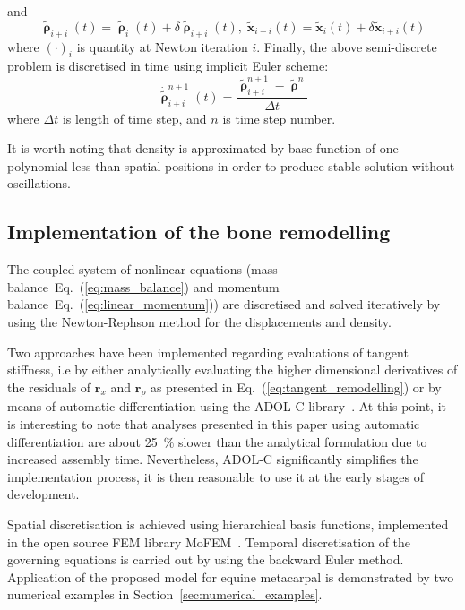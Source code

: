 \documentclass[11pt]{acmeArticle}
\numberwithin{equation}{section}
\begin{document}
and 
\begin{equation}
\tilde{\pmb\uprho}_{i+i}(t) =
\tilde{\pmb\uprho}_{i}(t) + \delta\tilde{\pmb\uprho}_{i+i}(t),\;
	\tilde{\mathbf{x}}_{i+i}(t) =
	\tilde{\mathbf{x}}_{i}(t) + \delta\tilde{\mathbf{x}}_{i+i}(t)
\end{equation}
where $(\cdot)_i$ is quantity at Newton iteration $i$. Finally, the
above semi-discrete problem is discretised in time using implicit Euler scheme:
\begin{equation}
	\dot{\tilde{\pmb\uprho}}_{i+i}^{n+1}(t) =
	\frac{
	\tilde{\pmb\uprho}_{i+i}^{n+1}-\tilde{\pmb\uprho}^{n}
	}{\Delta t}
\end{equation}
where $\Delta t$ is length of time step, and $n$ is time step number.

It is worth noting that density is approximated by base  function of one polynomial less than spatial positions in
order to produce stable solution without oscillations.

\subsection{Implementation of the bone remodelling}

The coupled system of nonlinear equations (mass
balance~Eq.~(\ref{eq:mass_balance}) and momentum
balance~Eq.~(\ref{eq:linear_momentum})) are discretised and solved iteratively by
using the Newton-Rephson method for the displacements and density.

Two approaches have been implemented regarding evaluations of tangent stiffness,
i.e by either analytically evaluating the higher dimensional derivatives of the residuals of $\mathbf{r}_{x}$ and $\mathbf{r}_{\rho}$ as 
presented in Eq.~(\ref{eq:tangent_remodelling}) or by means of automatic differentiation using the ADOL-C 
library~\citep{Walther2009}. At this point, it is interesting to note that analyses presented in this paper using automatic 
differentiation are about 25~$\%$ slower than the analytical formulation due to increased assembly time.
Nevertheless, ADOL-C significantly simplifies the implementation process, it is then reasonable to use it at the early stages of development.

Spatial discretisation is achieved using
hierarchical basis functions, implemented in the open source FEM library
MoFEM~\citep{mofem2017}. Temporal discretisation of the governing equations
is carried out by using the backward Euler method. Application of the proposed
model for equine metacarpal is demonstrated by two numerical examples in
Section~\ref{sec:numerical_examples}.
\end{document}
